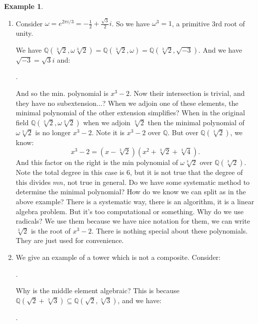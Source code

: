 \documentclass[9pt,reqno,twoside]{amsbook}
\theoremstyle{plain}
\numberwithin{section}{chapter}
\numberwithin{equation}{chapter}
\theoremstyle{definition}
\newtheorem{Ex}[theorem]{Example}
\theoremstyle{remark}
\theoremstyle{plain}
\newcommand{\sub}{\subseteq}
\newcommand{\Q}{\mathbb{Q}}
\newcommand{\fracc}{\frac}
\begin{document}
\begin{Ex}
\begin{enumerate}
\item Consider $\omega = e^{2\pi i/3} = -\fracc{1}{2} + \fracc{\sqrt{3}}{2}i$. So we have $\omega^3 = 1$, a primitive 3rd root of unity. 


We have $\Q(\sqrt[3]{2},\omega \sqrt[3]{2}) = \Q(\sqrt[3]{2},\omega)  = \Q(\sqrt[3]{2}, \sqrt{-3})$. And we have $\sqrt{-3} = \sqrt{3}i$ and:
\begin{center}
.
\end{center}
And so the min. polynomial is $x^3 - 2$. Now their intersection is trivial, and they have no subextension...? When we adjoin one of these elements, the minimal polynomial of the other extension simplifies? When in the original field $\Q(\sqrt[3]{2},\omega \sqrt[3]{2})$ when we adjoin $\sqrt[3]{2}$ then the minimal polynomial of $\omega \sqrt[3]{2}$ is no longer $x^3 - 2$. Note it is $x^3 - 2$ over $\Q$. But over $\Q(\sqrt[3]{2})$, we know:
$$
x^3 - 2 = (x - \sqrt[3]{2})(x^2 + \sqrt[3]{2} + \sqrt[3]{4}).
$$ 
And this factor on the right is the min polynomial of $\omega \sqrt[3]{2}$ over $\Q(\sqrt[3]{2})$. Note the total degree in this case is 6, but it is not true that the degree of this divides $mn$, not true in general. Do we have some systematic method to determine the minimal polynomial? How do we know we can split as in the above example? There is a systematic way, there is an algorithm, it is a linear algebra problem. But it's too computational or something. Why do we use radicals? We use them because we have nice notation for them, we can write $\sqrt[3]{2}$ is the root of $x^3 - 2$. There is nothing special about these polynomials. They are just used for convenience. 

\item We give an example of a tower which is not a composite. Consider:
\begin{center}
.
\end{center}
Why is the middle element algebraic? This is because $\Q(\sqrt{2} + \sqrt[3]{3}) \sub \Q(\sqrt{2},\sqrt[3]{3})$, and we have:
\begin{center}
.
\end{center}


\end{enumerate}
\end{Ex}
\end{document}
